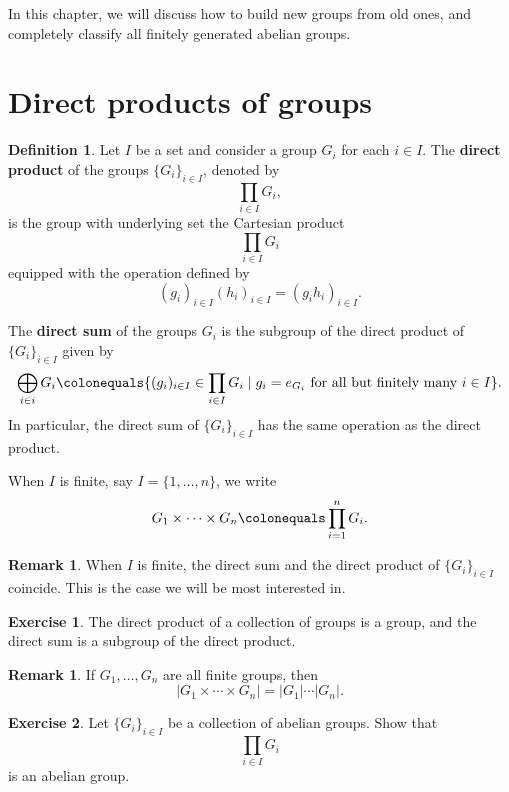 \documentclass[12pt]{report}
\numberwithin{equation}{section}
\numberwithin{theorem}{chapter}
\theoremstyle{definition}
\newtheorem{definition}[theorem]{Definition}
\newtheorem{exercise}{Exercise}
\newtheorem*{basic properties}{Basic Properties}
\newtheorem*{Important Remark}{Important Remark}
\newtheorem{remark}[theorem]{Remark}
\begin{document}
In this chapter, we will discuss how to build new groups from old ones, and completely classify all finitely generated abelian groups.


\section{Direct products of groups} 

\begin{definition}
Let $I$ be a set and consider a group $G_i$ for each $i \in I$.
The {\bf direct product} of the groups $\{ G_i \}_{i \in I}$, denoted by
$$\prod_{i \in I} G_i,$$
is the group with underlying set the Cartesian product 
$$\prod_{i \in I} G_i$$
equipped with the operation defined by
$$(g_i)_{i \in  I} (h_i)_{i \in I} = (g_i h_i)_{i \in I}.$$ 

The {\bf direct sum} of the groups $G_i$ is the subgroup of the direct product of  $\{ G_i \}_{i \in I}$ given by
$$\bigoplus_{i \in i} G_i \colonequals \{(g_i)_{i \in I} \in \prod_{i \in I} G_i \mid  g_i = e_{G_i} \text{ for all but finitely many } i \in I \}.$$ 
In particular, the direct sum of $\{ G_i \}_{i \in I}$ has the same operation as the direct product. 

When $I$ is finite, say $I = \{ 1, \ldots, n \}$, we write
$$G_1 \times \cdots \times G_n \colonequals \prod_{i = 1}^n G_i.$$
\end{definition}


\begin{remark}
	When $I$ is finite, the direct sum and the direct product of $\{ G_i \}_{i \in I}$ coincide. This is the case we will be most interested in.
\end{remark}


\begin{exercise}\label{direct product group}
	The direct product of a collection of groups is a group, and the direct sum is a subgroup of the direct product.
\end{exercise}


\begin{remark}
	If $G_1, \ldots, G_n$ are all finite groups, then
	$$|G_1 \times \cdots \times G_n| = |G_1| \cdots |G_n|.$$
\end{remark}


\begin{exercise}
	Let $\{ G_i \}_{i \in I}$ be a collection of abelian groups. Show that
	$$\prod_{i \in I} G_i$$
	is an abelian group.
\end{exercise}
\end{document}
